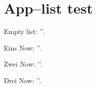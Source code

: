 \documentclass[a4paper]{article}
\begin{document}
\section{App--list test}
{

\pgfplotsapplistnewempty\foolist

\pgfplotsapplistedefcontenttomacro\foolist\to\content
Empty list: '\content'.

\pgfplotsapplistpushback Eins\to\foolist
\pgfplotsapplistedefcontenttomacro\foolist\to\content
Now: '\content'.

\pgfplotsapplistpushback Zwei\to\foolist
\pgfplotsapplistedefcontenttomacro\foolist\to\content
Now: '\content'.

\pgfplotsapplistpushback Drei\to\foolist
\pgfplotsapplistedefcontenttomacro\foolist\to\content
Now: '\content'.
}

% 
\end{document}
